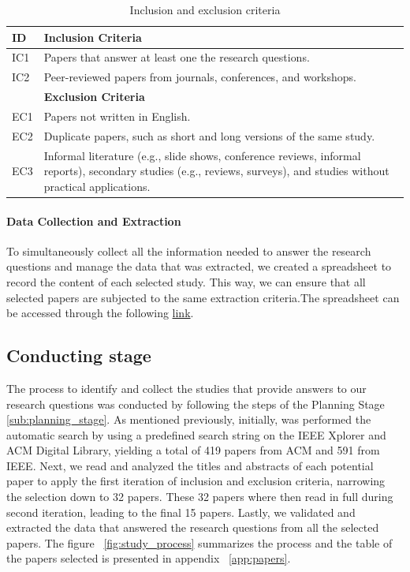 \begin{table}[htb]
\centering
\small
\renewcommand{\arraystretch}{0.9} %
\setlength{\tabcolsep}{4pt}
\begin{tabular}{p{6cm} p{8cm}}
  \toprule
  \textbf{ID} & \textbf{Inclusion Criteria} \\ 
  \midrule
  IC1 & Papers that answer at least one the research questions. \\ 
  \midrule
  IC2 & Peer-reviewed papers from journals, conferences, and workshops. \\ 
  \toprule
  \textbf{} & \textbf{Exclusion Criteria}  \\  
  \midrule
  EC1 & Papers not written in English. \\ 
  \midrule
  EC2 & Duplicate papers, such as short and long versions of the same study. \\ 
  \midrule
  EC3 & Informal literature (e.g., slide shows, conference reviews, informal reports), secondary studies (e.g., reviews, surveys), and studies without practical applications. \\ 
  \bottomrule
\end{tabular}
\caption{Inclusion and exclusion criteria}
\label{tab:criteria}
\end{table}
\vspace{1em}

\paragraph{Data Collection and Extraction}
To simultaneously collect all the information needed to answer the research questions and manage the data that was extracted, we created a spreadsheet to record the content of each selected study. This way, we can ensure that all selected papers are subjected to the same extraction criteria.The spreadsheet can be accessed through the following \href{https://docs.google.com/spreadsheets/d/12ZrNSq5YJwCggml846wV1xuJMiU4SFJl/edit?usp=sharing&ouid=110131575331589669328&rtpof=true&sd=true}{link}.

\subsection{Conducting stage}
The process to identify and collect the studies that provide answers to our research questions was conducted by following the steps of the Planning Stage \ref{sub:planning_stage}. As mentioned previously, initially, was performed the automatic search by  using a predefined search string on the IEEE Xplorer and ACM Digital Library, yielding a total of 419 papers from ACM and 591 from IEEE. 
Next, we read and analyzed the titles and abstracts of each potential paper to apply the first iteration of inclusion and exclusion criteria, narrowing the selection down to 32 papers. These 32 papers where then read in full during second iteration, leading to the final 15 papers. Lastly, we validated and extracted the data that answered the research questions from all the selected papers. The figure ~\ref{fig:study_process} summarizes the process and the table of the papers selected is presented in appendix ~\ref{app:papers}.


